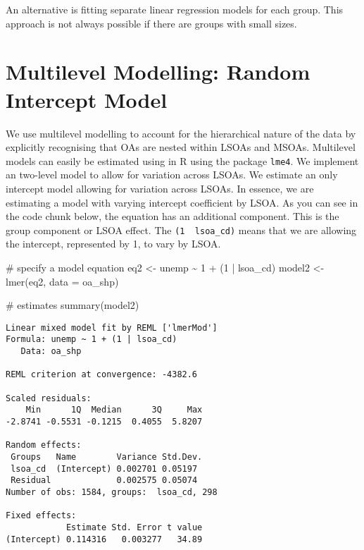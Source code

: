 \documentclass[
  letterpaper,
  krantz2]{style/krantz}
\newenvironment{Shaded}{\begin{snugshade}}{\end{snugshade}}
\newcommand{\AttributeTok}[1]{\textcolor[rgb]{0.40,0.45,0.13}{#1}}
\newcommand{\CommentTok}[1]{\textcolor[rgb]{0.37,0.37,0.37}{#1}}
\newcommand{\DecValTok}[1]{\textcolor[rgb]{0.68,0.00,0.00}{#1}}
\newcommand{\FunctionTok}[1]{\textcolor[rgb]{0.28,0.35,0.67}{#1}}
\newcommand{\NormalTok}[1]{\textcolor[rgb]{0.00,0.23,0.31}{#1}}
\newcommand{\OtherTok}[1]{\textcolor[rgb]{0.00,0.23,0.31}{#1}}
\newcommand{\SpecialCharTok}[1]{\textcolor[rgb]{0.37,0.37,0.37}{#1}}
\begin{document}
An alternative is fitting separate linear regression models for each
group. This approach is not always possible if there are groups with
small sizes.

\hypertarget{multilevel-modelling-random-intercept-model}{%
\section{Multilevel Modelling: Random Intercept
Model}\label{multilevel-modelling-random-intercept-model}}

We use multilevel modelling to account for the hierarchical nature of
the data by explicitly recognising that OAs are nested within LSOAs and
MSOAs. Multilevel models can easily be estimated using in R using the
package \texttt{lme4}. We implement an two-level model to allow for
variation across LSOAs. We estimate an only intercept model allowing for
variation across LSOAs. In essence, we are estimating a model with
varying intercept coefficient by LSOA. As you can see in the code chunk
below, the equation has an additional component. This is the group
component or LSOA effect. The \texttt{(1\ \textbar{}\ lsoa\_cd)} means
that we are allowing the intercept, represented by 1, to vary by LSOA.

\begin{Shaded}
\begin{Highlighting}[]
\CommentTok{\# specify a model equation}
\NormalTok{eq2 }\OtherTok{\textless{}{-}}\NormalTok{ unemp }\SpecialCharTok{\textasciitilde{}} \DecValTok{1} \SpecialCharTok{+}\NormalTok{ (}\DecValTok{1} \SpecialCharTok{|}\NormalTok{ lsoa\_cd)}
\NormalTok{model2 }\OtherTok{\textless{}{-}} \FunctionTok{lmer}\NormalTok{(eq2, }\AttributeTok{data =}\NormalTok{ oa\_shp)}

\CommentTok{\# estimates}
\FunctionTok{summary}\NormalTok{(model2)}
\end{Highlighting}
\end{Shaded}

\begin{verbatim}
Linear mixed model fit by REML ['lmerMod']
Formula: unemp ~ 1 + (1 | lsoa_cd)
   Data: oa_shp

REML criterion at convergence: -4382.6

Scaled residuals: 
    Min      1Q  Median      3Q     Max 
-2.8741 -0.5531 -0.1215  0.4055  5.8207 

Random effects:
 Groups   Name        Variance Std.Dev.
 lsoa_cd  (Intercept) 0.002701 0.05197 
 Residual             0.002575 0.05074 
Number of obs: 1584, groups:  lsoa_cd, 298

Fixed effects:
            Estimate Std. Error t value
(Intercept) 0.114316   0.003277   34.89
\end{verbatim}
\end{document}
